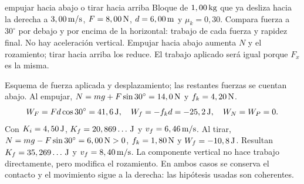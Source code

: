 \documentclass[11pt,a4paper]{article}
\begin{document}
\begin{examplebox}{empujar hacia abajo o tirar hacia arriba}
 Bloque de $1,00\,\mathrm{kg}$ que ya desliza hacia la derecha a
$3,00\,\mathrm{m/s}$, $F=8,00\,\mathrm{N}$, $d=6,00\,\mathrm{m}$ y $\mu_k=0,30$.
Compara fuerza a $30^\circ$ por debajo y por encima de la horizontal:
trabajo de cada fuerza y rapidez final.
\solutionblock
{} No hay aceleraci\'on vertical. Empujar hacia abajo aumenta $N$
y el rozamiento; tirar hacia arriba los reduce. El trabajo aplicado ser\'a
igual porque $F_x$ es la misma.
\begin{center}
\end{center}
Esquema de fuerza aplicada y desplazamiento; las restantes fuerzas se cuentan abajo.
 Al empujar, $N=mg+F\sin30^\circ=14,0\,\mathrm{N}$ y $f_k=4,20\,\mathrm{N}$.
\[
W_F=Fd\cos30^\circ=41,6\,\mathrm{J},\quad
W_f=-f_kd=-25,2\,\mathrm{J},\quad W_N=W_P=0.
\]
Con $K_i=4,50\,\mathrm{J}$, $K_f=20,869\ldots\,\mathrm{J}$ y $v_f=6,46\,\mathrm{m/s}$.
Al tirar, $N=mg-F\sin30^\circ=6,00\,\mathrm{N}>0$,
$f_k=1,80\,\mathrm{N}$ y $W_f=-10,8\,\mathrm{J}$.
Resultan $K_f=35,269\ldots\,\mathrm{J}$ y $v_f=8,40\,\mathrm{m/s}$.
 La componente vertical no hace trabajo directamente,
pero modifica el rozamiento. En ambos casos se conserva el contacto y el
movimiento sigue a la derecha: las hip\'otesis usadas son coherentes.
\end{examplebox}
\end{document}
